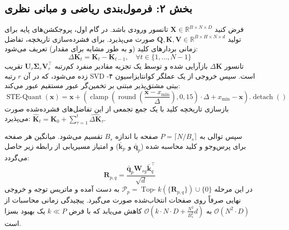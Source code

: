 \subsection*{بخش ۲: فرمول‌بندی ریاضی و مبانی نظری }
فرض کنید $\mathbf{X} \in \mathbb{R}^{B \times N \times D}$ تانسور ورودی باشد. در گام اول، پروجکشن‌های پایه برای تولید $\mathbf{Q}, \mathbf{K}, \mathbf{V} \in \mathbb{R}^{B \times H \times N \times d}$ صورت می‌پذیرد.
برای فشرده‌سازی تاریخچه، تفاضل زمانی بردارهای کلید (و به طور مشابه برای مقدار) تعریف می‌شود:
\begin{equation}
\Delta \mathbf{K}_t = \mathbf{K}_t - \mathbf{K}_{t-1}, \quad \forall t \in \{1, \dots, N-1\}
\end{equation}
تانسور $\Delta \mathbf{K}$ بازآرایی شده و توسط یک تجزیه مقادیر منفرد کم‌رتبه $\mathbf{U}_r \mathbf{\Sigma}_r \mathbf{V}_r^\top$ تقریب زده می‌شود، که در آن $r$ رتبه SVD است. سپس خروجی از یک عملگر کوانتایزاسیون ۴-بیتی مشتق‌پذیر مبتنی بر تخمین‌گر عبور مستقیم  عبور می‌کند:
\begin{equation}
\operatorname{STE-Quant}(\mathbf{x}) = \mathbf{x} + \left( \operatorname{clamp}\left( \operatorname{round}\left( \frac{\mathbf{x} - x_{\min}}{\Delta} \right), 0, 15 \right) \cdot \Delta + x_{\min} - \mathbf{x} \right).\operatorname{detach}()
\end{equation}
بازسازی تاریخچه کلید با یک جمع تجمعی  از این تفاضل‌های فشرده‌شده صورت می‌پذیرد: $\hat{\mathbf{K}}_t = \mathbf{K}_0 + \sum_{\tau=1}^t \widehat{\Delta \mathbf{K}}_\tau$.

سپس توالی به $P = \lceil N / B_s \rceil$ صفحه با اندازه $B_s$ تقسیم می‌شود. میانگین  هر صفحه برای پرس‌وجو و کلید محاسبه شده ($\bar{\mathbf{q}}_p$ و $\bar{\mathbf{k}}_p$) و امتیاز مسیریابی از رابطه زیر حاصل می‌گردد:
\begin{equation}
\mathbf{R}_{p, q} = \frac{\bar{\mathbf{q}}_p \mathbf{W}_{rg} \bar{\mathbf{k}}_q^\top}{\sqrt{d}}
\end{equation}
در این مرحله $\mathcal{P}_p = \operatorname{Top-}k(\{\mathbf{R}_{p, q}\}) \cup \{0\}$ به دست آمده و ماتریس توجه و خروجی نهایی صرفاً روی صفحات انتخاب‌شده صورت می‌گیرد.
پیچیدگی زمانی محاسبات از $\mathcal{O}(N^2 \cdot D)$ به $\mathcal{O}(k \cdot N \cdot D + \frac{N^2}{B_s^2} d)$ کاهش می‌یابد که با فرض $k \ll P$ یک بهبود بسزا است.

